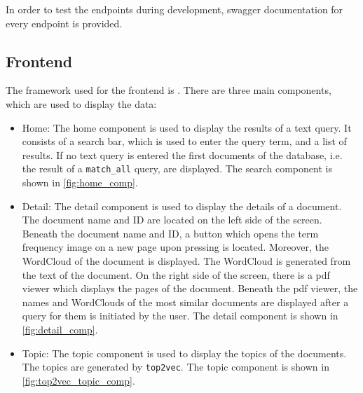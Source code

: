 In order to test the endpoints during development, swagger documentation for every endpoint is provided.





\subsection{Frontend}\label{subsec:frontend}

The framework used for the frontend is \angular{}.
There are three main components, which are used to display the data:

\begin{itemize}
    \item \label{pt:home}Home: 
        The home component is used to display the results of a text query.
        It consists of a search bar, which is used to enter the query term, and a list of results.
        If no text query is entered the first documents of the database, i.e. the result of a \texttt{match\_all} query, are displayed.
        The search component is shown in \autoref{fig:home_comp}.

    \item \label{pt:detail}Detail: 
        The detail component is used to display the details of a document.
        The document name and ID are located on the left side of the screen.
        Beneath the document name and ID, a button which opens the term frequency image on a new page upon pressing is located. 
        Moreover, the WordCloud of the document is displayed.
        The WordCloud is generated from the text of the document.
        On the right side of the screen, there is a \ac{pdf} viewer which displays the pages of the document.
        Beneath the \ac{pdf} viewer, the names and WordClouds of the most similar documents are displayed after a query for them is initiated by the user.
        The detail component is shown in \autoref{fig:detail_comp}.

    \item \label{pt:topic}Topic: 
        The topic component is used to display the topics of the documents.
        The topics are generated by \texttt{top2vec}.
        The topic component is shown in \autoref{fig:top2vec_topic_comp}.
\end{itemize}


